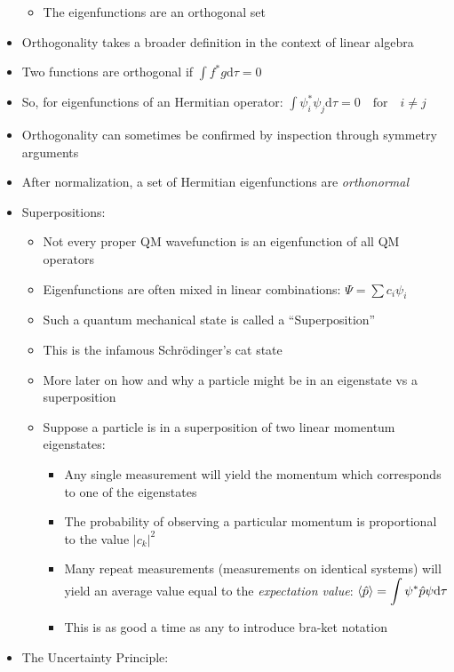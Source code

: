 \documentclass[12pt, openany, letterpaper]{memoir}
\begin{document}
\begin{itemize}
\begin{itemize}
		\item The eigenfunctions are an orthogonal set
	\end{itemize}
	\item Orthogonality takes a broader definition in the context of linear algebra
	\item Two functions are orthogonal if $\displaystyle\int f^*g\mathrm{d}\tau=0$
	\item So, for eigenfunctions of an Hermitian operator: $\displaystyle\int\psi_i^*\psi_j\mathrm{d}\tau=0\hspace{1em}\mathrm{for}\hspace{1em} i\neq j$
	\item Orthogonality can sometimes be confirmed by inspection through symmetry arguments
	\item After normalization, a set of Hermitian eigenfunctions are \emph{orthonormal}
	\item Superpositions:
	\begin{itemize}
		\item Not every proper QM wavefunction is an eigenfunction of all QM operators
		\item Eigenfunctions are often mixed in linear combinations: $\Psi = \displaystyle\sum c_i\psi_i$
		\item Such a quantum mechanical state is called a “Superposition”
		\item This is the infamous Schr\"odinger's cat state
		\item More later on how and why a particle might be in an eigenstate vs a superposition
		\item Suppose a particle is in a superposition of two linear momentum eigenstates:
		\begin{itemize}
			\item Any single measurement will yield the momentum which corresponds to one of the eigenstates
			\item The probability of observing a particular momentum is proportional to the value $\left|c_k\right|^2$
			\item Many repeat measurements (measurements on identical systems) will yield an average value equal to the \emph{expectation value}: $\left< \hat{p} \right> = \displaystyle\int\psi^*\hat{p}\psi\mathrm{d}\tau$
			\item This is as good a time as any to introduce bra-ket notation
		\end{itemize}
	\end{itemize}
	\item The Uncertainty Principle:

\end{itemize}
\end{document}
